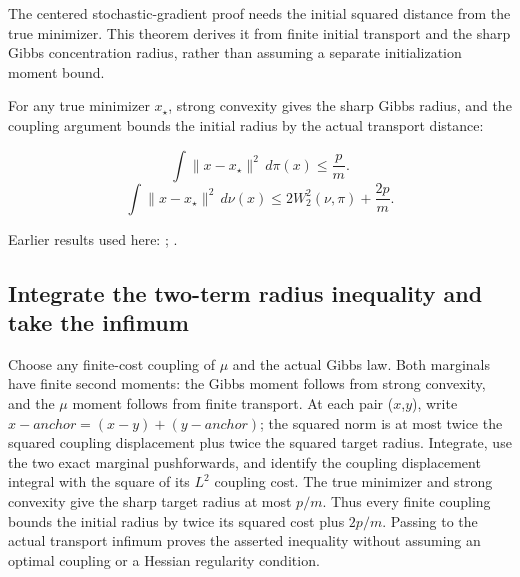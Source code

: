 \documentclass[11pt,a4paper]{report}
\begin{document}
The centered stochastic-gradient proof needs the initial squared distance from the true minimizer. This theorem derives it from finite initial transport and the sharp Gibbs concentration radius, rather than assuming a separate initialization moment bound.



For any true minimizer \(x_\star\), strong convexity gives the sharp Gibbs radius, and the coupling argument bounds the initial radius by the actual transport distance:


\[\int\|x-x_\star\|^2\,d\pi(x)\le\frac pm.\]
\[\int\|x-x_\star\|^2\,d\nu(x)\le2W_2^2(\nu,\pi)+\frac{2p}{m}.\]

Earlier results used here: \cite[Section~3.5]{LangevinLean2026Proximal}; \cite[Section~3.32]{LangevinLean2026ULASC}.
\subsection{\texorpdfstring{Integrate the two-term radius inequality and take the infimum}{Integrate the two-term radius inequality and take the infimum}}
\label{report-step-AverageLMC-InitialMoment-lean-1}


Choose any finite-cost coupling of \(\mu\) and the actual Gibbs law. Both marginals have finite second moments: the Gibbs moment follows from strong convexity, and the \(\mu\) moment follows from finite transport. At each pair (\(x\),\(y\)), write \(x-anchor=(x-y)+(y-anchor)\); the squared norm is at most twice the squared coupling displacement plus twice the squared target radius. Integrate, use the two exact marginal pushforwards, and identify the coupling displacement integral with the square of its \(L^{2}\) coupling cost. The true minimizer and strong convexity give the sharp target radius at most \(p/m\). Thus every finite coupling bounds the initial radius by twice its squared cost plus \(2p/m\). Passing to the actual transport infimum proves the asserted inequality without assuming an optimal coupling or a Hessian regularity condition.
\end{document}

